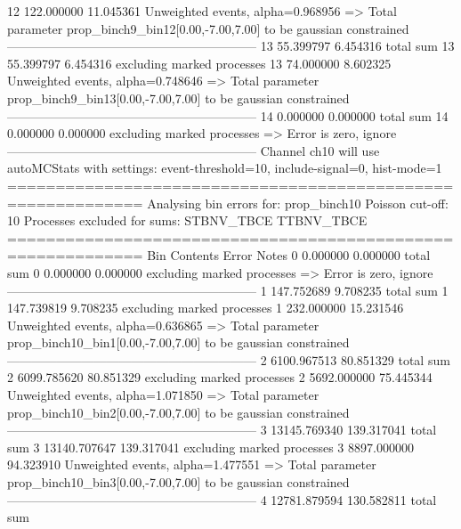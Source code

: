 12         122.000000      11.045361       Unweighted events, alpha=0.968956
  => Total parameter prop_binch9_bin12[0.00,-7.00,7.00] to be gaussian constrained
------------------------------------------------------------
13         55.399797       6.454316        total sum                     
13         55.399797       6.454316        excluding marked processes    
13         74.000000       8.602325        Unweighted events, alpha=0.748646
  => Total parameter prop_binch9_bin13[0.00,-7.00,7.00] to be gaussian constrained
------------------------------------------------------------
14         0.000000        0.000000        total sum                     
14         0.000000        0.000000        excluding marked processes    
  => Error is zero, ignore      
------------------------------------------------------------
Channel ch10 will use autoMCStats with settings: event-threshold=10, include-signal=0, hist-mode=1
============================================================
Analysing bin errors for: prop_binch10
Poisson cut-off: 10
Processes excluded for sums: STBNV_TBCE TTBNV_TBCE
============================================================
Bin        Contents        Error           Notes                         
0          0.000000        0.000000        total sum                     
0          0.000000        0.000000        excluding marked processes    
  => Error is zero, ignore      
------------------------------------------------------------
1          147.752689      9.708235        total sum                     
1          147.739819      9.708235        excluding marked processes    
1          232.000000      15.231546       Unweighted events, alpha=0.636865
  => Total parameter prop_binch10_bin1[0.00,-7.00,7.00] to be gaussian constrained
------------------------------------------------------------
2          6100.967513     80.851329       total sum                     
2          6099.785620     80.851329       excluding marked processes    
2          5692.000000     75.445344       Unweighted events, alpha=1.071850
  => Total parameter prop_binch10_bin2[0.00,-7.00,7.00] to be gaussian constrained
------------------------------------------------------------
3          13145.769340    139.317041      total sum                     
3          13140.707647    139.317041      excluding marked processes    
3          8897.000000     94.323910       Unweighted events, alpha=1.477551
  => Total parameter prop_binch10_bin3[0.00,-7.00,7.00] to be gaussian constrained
------------------------------------------------------------
4          12781.879594    130.582811      total sum                     
